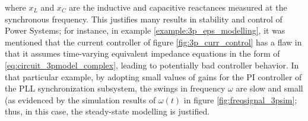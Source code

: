 	\noindent where $x_L$ and $x_C$ are the inductive and capacitive reactances measured at the synchronous frequency. This justifies many results in stability and control of Power Systems; for instance, in example \ref{example:3p_eps_modelling}, it was mentioned that the current controller of figure \ref{fig:3p_curr_control} has a flaw in that it assumes time-varying equivalent impedance equations in the form of \eqref{eq:circuit_3pmodel_complex}, leading to potentially bad controller behavior. In that particular example, by adopting small values of gains for the PI controller of the PLL synchronization subsystem, the swings in frequency $\omega$ are slow and small (as evidenced by the simulation results of $\omega(t)$ in figure \ref{fig:freqsignal_3psim}; thus, in this case, the steady-state modelling is justified.
